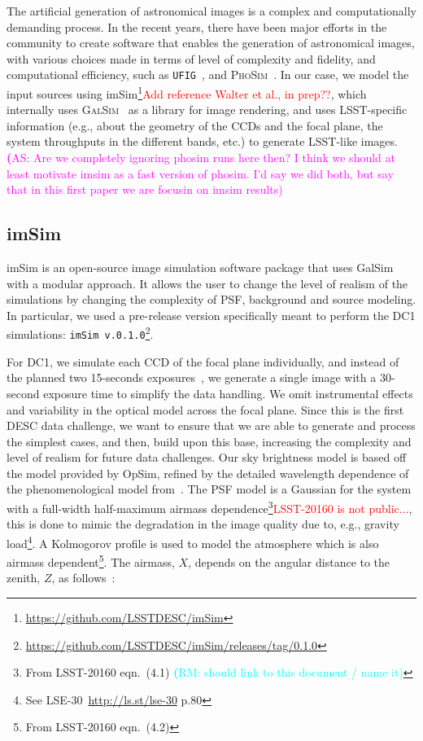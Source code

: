 \documentclass[twocolumn]{aastex62}
\newcommand{\rachel}[1]{{\textcolor{cyan}{{\textbf (RM: #1)}}}}
\newcommand{\as}[1]{{\textcolor{magenta}{{\textbf (AS: #1)}}}}
\begin{document}
The artificial generation of astronomical images is a complex and computationally demanding process. In the recent
years, there have been major efforts in the community to create software that enables the generation of astronomical images, with various choices made in terms of level of complexity and fidelity, and computational efficiency, such as \texttt{UFIG}~\citep{2016ApJ...817...25B}, and \textsc{PhoSim}~\citep{2015ApJS..218...14P}. In our case, we model the input sources using imSim\footnote{\url{https://github.com/LSSTDESC/imSim}}\textcolor{red}{Add reference Walter et al., in prep??}, which internally uses \textsc{GalSim}~\citep{2015A&C....10..121R} as a library for image rendering, and uses LSST-specific information (e.g., about the geometry of the CCDs and the focal plane, the system throughputs in the different bands, etc.) to generate LSST-like images.
\as{Are we completely ignoring phosim runs here then? I think we should at least motivate imsim as a fast version of phosim. I'd say we did both, but say that in this first paper we are focusin on imsim results}


\subsection{imSim}
\label{sec:imsim_pipeline}

imSim is an open-source image simulation software package that uses GalSim with a modular approach. It allows the user to change the level of realism of the simulations by changing the complexity of PSF, background and source modeling. In particular, we used a pre-release version specifically meant to perform the DC1 simulations: \texttt{imSim v.0.1.0}\footnote{\url{https://github.com/LSSTDESC/imSim/releases/tag/0.1.0}}.


For DC1, we simulate each CCD of the focal plane individually, and instead of the planned two 15-seconds exposures~\citep{Overview}, we generate a single image with a 30-second exposure time to simplify the data handling. We omit instrumental effects and variability in the optical model across the focal plane. Since this is the first DESC data challenge, we want to ensure that we are able to generate and process the simplest cases, and then, build upon this base, increasing the complexity and level of realism for future data challenges. Our sky brightness model is based off the \citet{1991PASP..103.1033K} model provided by OpSim, refined by the detailed wavelength dependence of the phenomenological model from~\citet{2016SPIE.9910E..1AY}. The PSF model is a Gaussian for the system with a full-width half-maximum airmass dependence\footnote{From LSST-20160 eqn.~(4.1) \rachel{should link to this document / name it}}\textcolor{red}{LSST-20160 is not public...}, this is done to mimic the degradation in the image quality due to, e.g., gravity load\footnote{See LSE-30~\url{http://ls.st/lse-30} p.80}. A Kolmogorov profile is used to model the atmosphere which is also airmass dependent\footnote{From LSST-20160 eqn.~(4.2)}. The airmass, $X$, depends on the angular distance to the zenith, $Z$, as follows~\citep{1991PASP..103.1033K}:
\end{document}
